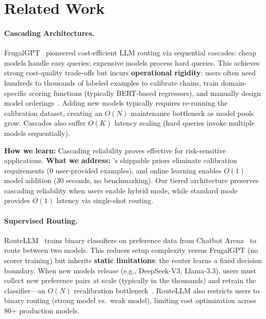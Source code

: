 
\section{Related Work}
\label{sec:related_work}

\paragraph{Cascading Architectures.}
FrugalGPT~\cite{chen2023frugalgpt} pioneered cost-efficient LLM routing via sequential cascades: cheap models handle easy queries; expensive models process hard queries. This achieves strong cost-quality trade-offs but incurs \textbf{operational rigidity}: users often need hundreds to thousands of labeled examples to calibrate chains, train domain-specific scoring functions (typically BERT-based regressors), and manually design model orderings~\cite{chen2023frugalgpt}. Adding new models typically requires re-running the calibration dataset, creating an $O(N)$ maintenance bottleneck as model pools grow. Cascades also suffer $O(K)$ latency scaling (hard queries invoke multiple models sequentially).

\textbf{How we learn:} Cascading reliability proves effective for risk-sensitive applications. \textbf{What we address:} \ours{}'s shippable priors eliminate calibration requirements (0 user-provided examples), and online learning enables $O(1)$ model addition (30 seconds, no benchmarking). Our tiered architecture preserves cascading reliability when users enable hybrid mode, while standard mode provides $O(1)$ latency via single-shot routing.

\paragraph{Supervised Routing.}
RouteLLM~\cite{ong2024routellm} trains binary classifiers on preference data from Chatbot Arena~\cite{zheng2023judging} to route between two models. This reduces setup complexity versus FrugalGPT (no scorer training) but inherits \textbf{static limitations}: the router learns a fixed decision boundary. When new models release (e.g., DeepSeek-V3, Llama-3.3), users must collect new preference pairs at scale (typically in the thousands) and retrain the classifier---an $O(N)$ recalibration bottleneck~\cite{ong2024routellm}. RouteLLM also restricts users to binary routing (strong model vs.\ weak model), limiting cost optimization across 80+ production models.

